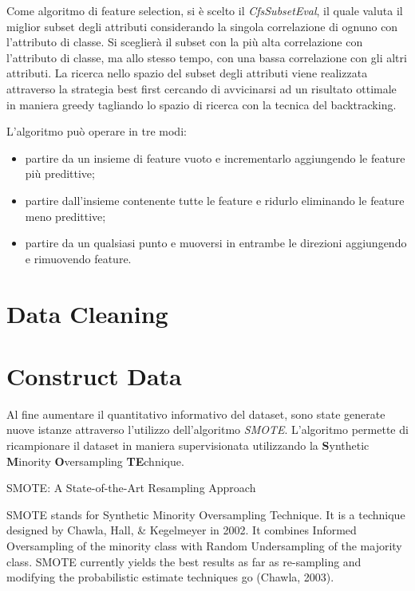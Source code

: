 Come algoritmo di feature selection, si è scelto il \textit{CfsSubsetEval}, il quale valuta il miglior subset degli attributi considerando la singola correlazione di ognuno con l'attributo di classe. Si sceglierà il subset con la più alta correlazione con l'attributo di classe, ma allo stesso tempo, con una bassa correlazione con gli altri attributi. La ricerca nello spazio del subset degli attributi viene realizzata attraverso la strategia best first cercando di avvicinarsi ad un risultato ottimale in maniera greedy tagliando lo spazio di ricerca con la tecnica del backtracking.\cite{Hall1998}

L'algoritmo può operare in tre modi:
\begin{itemize}
	\item partire da un insieme di feature vuoto e incrementarlo aggiungendo le feature più predittive;
	\item partire dall'insieme contenente tutte le feature e ridurlo eliminando le feature meno predittive;
	\item partire da un qualsiasi punto e muoversi in entrambe le direzioni aggiungendo e rimuovendo feature.
\end{itemize}

\section{Data Cleaning}

\section{Construct Data}

Al fine aumentare il quantitativo informativo del dataset, sono state generate nuove istanze attraverso l'utilizzo dell'algoritmo \textit{SMOTE}. L'algoritmo permette di ricampionare il dataset in maniera supervisionata utilizzando la \textbf{S}ynthetic \textbf{M}inority \textbf{O}versampling \textbf{TE}chnique. 
\cite{Chawla02smote:synthetic}

SMOTE: A State-of-the-Art Resampling Approach 

SMOTE stands for Synthetic Minority Oversampling Technique. 
It is a technique designed by Chawla, Hall, \& Kegelmeyer  in 2002.
It combines Informed Oversampling of the minority class with Random Undersampling        of the majority class.
SMOTE currently yields the best results as far as re-sampling and modifying the probabilistic estimate techniques go (Chawla, 2003).

